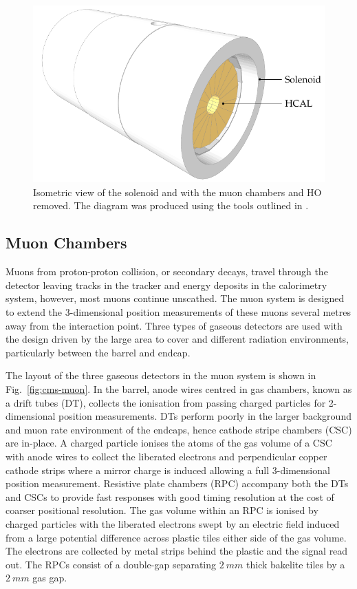 \begin{figure}[htb]
    \centering
    \includegraphics{diagrams/tikz/cms/annotated/cms_magnet.pdf}
    \caption[Isometric view of the CMS solenoid encompassing the HCAL.]{
        Isometric view of the solenoid and \HCAL with the muon chambers and
        HO removed. The diagram was produced using the tools outlined in
        \cite{Sakuma:2013jqa}.
    }
    \label{fig:cms-magnet}
\end{figure}


\subsection{Muon Chambers}

Muons from proton-proton collision, or secondary decays, travel through the
detector leaving tracks in the tracker and energy deposits in the calorimetry
system, however, most muons continue unscathed. The muon system is designed to
extend the 3-dimensional position measurements of these muons several metres
away from the interaction point. Three types of gaseous detectors are used
with the design driven by the large area to cover and different radiation
environments, particularly between the barrel and endcap.

The layout of the three gaseous detectors in the \CMS muon system is shown in
{Fig.~\ref{fig:cms-muon}}. In the barrel, anode wires centred in gas chambers,
known as a drift tubes (DT), collects the ionisation from passing charged
particles for 2-dimensional position measurements. DTs perform poorly in the
larger background and muon rate environment of the endcaps, hence cathode
stripe chambers (CSC) are in-place. A charged particle ionises the atoms of
the gas volume of a CSC with anode wires to collect the liberated electrons
and perpendicular copper cathode strips where a mirror charge is induced
allowing a full 3-dimensional position measurement. Resistive plate chambers
(RPC) accompany both the DTs and CSCs to provide fast responses with good
timing resolution at the cost of coarser positional resolution. The gas volume
within an RPC is ionised by charged particles with the liberated electrons
swept by an electric field induced from a large potential difference across
plastic tiles either side of the gas volume. The electrons are collected by
metal strips behind the plastic and the signal read out. The \CMS RPCs consist
of a double-gap separating ${\SI{2}{mm}}$ thick bakelite tiles by a
${\SI{2}{mm}}$ gas gap. 

